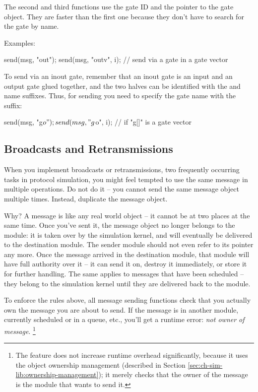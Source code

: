 The second and third functions use the gate ID and the pointer to the gate
object. They are faster than the first one because they don't have to
search for the gate by name.

Examples:

\begin{cpp}
send(msg, "out");
send(msg, "outv", i); // send via a gate in a gate vector
\end{cpp}

To send via an inout gate, remember that an inout gate is an input and an
output gate glued together, and the two halves can be identified with the
 and  name suffixes. Thus, for sending you need to specify
the gate name with the  suffix:

\begin{cpp}
send(msg, "g$o");
send(msg, "g$o", i); // if "g[]" is a gate vector
\end{cpp}


\subsection{Broadcasts and Retransmissions}

When you implement broadcasts or retransmissions, two frequently
occurring tasks in protocol simulation, you might feel tempted
to use the same message in multiple  operations.
Do not do it -- you cannot send the same message object multiple times.
Instead, duplicate the message object.

Why? A message is like any real world object -- it cannot be at two places
at the same time. Once you've sent it, the message object no longer belongs
to the module: it is taken over by the simulation kernel, and will
eventually be delivered to the destination module. The sender module should
not even refer to its pointer any more. Once the message arrived in the
destination module, that module will have full authority over it -- it can
send it on, destroy it immediately, or store it for further handling. The
same applies to messages that have been scheduled -- they belong to the
simulation kernel until they are delivered back to the module.

To enforce the rules above, all message sending functions check that you
actually own the message you are about to send. If the message is in
another module, currently scheduled or in a queue, etc., you'll get a
runtime error: \textit{not owner of message}.
  \footnote{The feature does not increase runtime overhead significantly, because
  it uses the object ownership management (described in
  Section \ref{sec:ch-sim-lib:ownership-management});
  it merely checks that the owner of the message is the module that
  wants to send it.}


